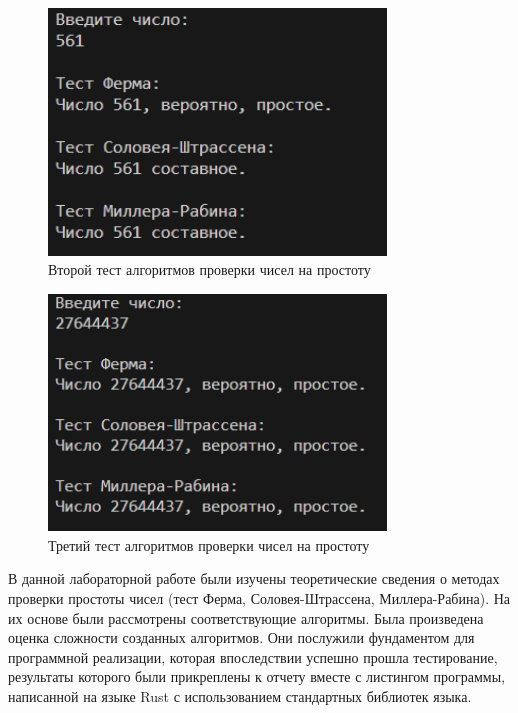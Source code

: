 \documentclass[bachelor, och, labwork]{shiza}
\begin{document}
        \begin{figure}[H]
            \centering
            \includegraphics[width=0.8\textwidth]{pic/2.png}
            \caption{Второй тест алгоритмов проверки чисел на простоту}
        \end{figure}

        \begin{figure}[H]
            \centering
            \includegraphics[width=0.8\textwidth]{pic/3.png}
            \caption{Третий тест алгоритмов проверки чисел на простоту}
        \end{figure}

\conclusion

    В данной лабораторной работе были изучены теоретические сведения о методах
    проверки простоты чисел (тест Ферма, Соловея-Штрассена, Миллера-Рабина). На
    их основе были рассмотрены соответствующие алгоритмы. Была произведена
    оценка сложности созданных алгоритмов. Они послужили фундаментом для
    программной реализации, которая впоследствии успешно прошла тестирование,
    результаты которого были прикреплены к отчету вместе с листингом программы,
    написанной на языке Rust с использованием стандартных библиотек языка.
\end{document}
